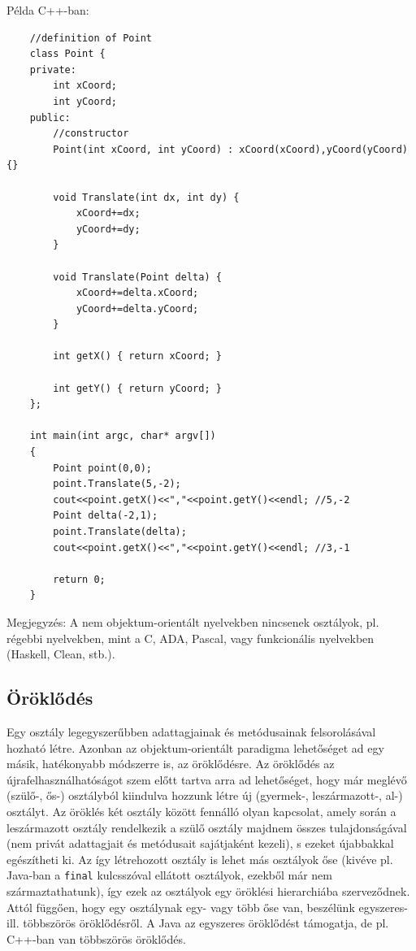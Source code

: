 \documentclass[margin=0px]{article}
\begin{document}
	\noindent Példa C++-ban:
	\begin{verbatim}
	//definition of Point
	class Point {
	private:
	    int xCoord;
	    int yCoord;
	public:
	    //constructor
	    Point(int xCoord, int yCoord) : xCoord(xCoord),yCoord(yCoord) {}
	    
	    void Translate(int dx, int dy) {
	        xCoord+=dx;
	        yCoord+=dy;
	    }
	    
	    void Translate(Point delta) {
	        xCoord+=delta.xCoord;
	        yCoord+=delta.yCoord;
	    }
	    
	    int getX() { return xCoord; }
	    
	    int getY() { return yCoord; }
	};
	
	int main(int argc, char* argv[])
	{
	    Point point(0,0);
	    point.Translate(5,-2);
	    cout<<point.getX()<<","<<point.getY()<<endl; //5,-2
	    Point delta(-2,1);
	    point.Translate(delta);
	    cout<<point.getX()<<","<<point.getY()<<endl; //3,-1
	    
	    return 0;
	}
	\end{verbatim}
	
	Megjegyzés: A nem objektum-orientált nyelvekben nincsenek osztályok, pl. régebbi nyelvekben, mint a C, ADA, Pascal, vagy
	funkcionális nyelvekben (Haskell, Clean, stb.).
	
	\subsection{Öröklődés}
	
	Egy osztály legegyszerűbben adattagjainak és metódusainak felsorolásával hozható létre. Azonban az objektum-orientált paradigma lehetőséget ad egy másik, hatékonyabb módszerre is, az öröklődésre. Az öröklődés az újrafelhasználhatóságot szem előtt tartva arra ad lehetőséget, hogy már meglévő (szülő-, ős-) osztályból kiindulva hozzunk létre új (gyermek-, leszármazott-, al-) osztályt. Az öröklés két osztály között fennálló olyan kapcsolat, amely során a leszármazott osztály rendelkezik a szülő osztály majdnem összes tulajdonságával (nem privát adattagjait és metódusait sajátjaként kezeli), s ezeket újabbakkal egészítheti ki. Az így létrehozott osztály is lehet más osztályok őse (kivéve pl. Java-ban a \texttt{final} kulcsszóval ellátott osztályok, ezekből már nem származtathatunk), így ezek az osztályok egy öröklési hierarchiába szerveződnek. Attól függően, hogy egy osztálynak egy- vagy több őse van, beszélünk egyszeres- ill. többszörös öröklődésről. A Java az egyszeres öröklődést támogatja, de pl. C++-ban van többszörös öröklődés.
	
\end{document}
